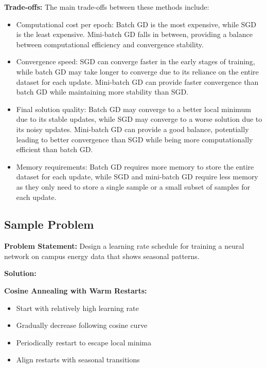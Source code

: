 \documentclass[
  letterpaper,
  DIV=11,
  numbers=noendperiod]{scrreprt}
\providecommand{\tightlist}{%
  \setlength{\itemsep}{0pt}\setlength{\parskip}{0pt}}
\begin{document}
\textbf{Trade-offs:} The main trade-offs between these methods include:

\begin{itemize}
\item
  Computational cost per epoch: Batch GD is the most expensive, while
  SGD is the least expensive. Mini-batch GD falls in between, providing
  a balance between computational efficiency and convergence stability.
\item
  Convergence speed: SGD can converge faster in the early stages of
  training, while batch GD may take longer to converge due to its
  reliance on the entire dataset for each update. Mini-batch GD can
  provide faster convergence than batch GD while maintaining more
  stability than SGD.
\item
  Final solution quality: Batch GD may converge to a better local
  minimum due to its stable updates, while SGD may converge to a worse
  solution due to its noisy updates. Mini-batch GD can provide a good
  balance, potentially leading to better convergence than SGD while
  being more computationally efficient than batch GD.
\item
  Memory requirements: Batch GD requires more memory to store the entire
  dataset for each update, while SGD and mini-batch GD require less
  memory as they only need to store a single sample or a small subset of
  samples for each update.
\end{itemize}

\subsection{Sample Problem}\label{sample-problem-22}

\textbf{Problem Statement:} Design a learning rate schedule for training
a neural network on campus energy data that shows seasonal patterns.

\textbf{Solution:}

\textbf{Cosine Annealing with Warm Restarts:}

\begin{itemize}
\tightlist
\item
  Start with relatively high learning rate
\item
  Gradually decrease following cosine curve
\item
  Periodically restart to escape local minima
\item
  Align restarts with seasonal transitions
\end{itemize}
\end{document}
